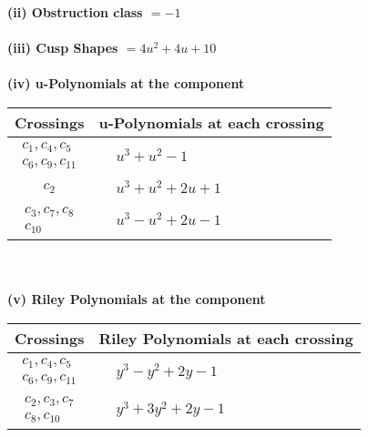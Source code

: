 \documentclass[1p]{elsarticle_modified}
\theoremstyle{definition}
\begin{document}
\flushleft \textbf{(ii) Obstruction class $= -1$}\\~\\
\flushleft \textbf{(iii) Cusp Shapes $= 4 u^2+4 u+10$}\\~\\
\newpage\renewcommand{\arraystretch}{1}
\flushleft \textbf{(iv) u-Polynomials at the component}\newline \\
\begin{tabular}{m{50pt}|m{274pt}}
Crossings & \hspace{64pt}u-Polynomials at each crossing \\
\hline $$\begin{aligned}c_{1},c_{4},c_{5}\\c_{6},c_{9},c_{11}\end{aligned}$$&$\begin{aligned}
&u^3+u^2-1
\end{aligned}$\\
\hline $$\begin{aligned}c_{2}\end{aligned}$$&$\begin{aligned}
&u^3+u^2+2 u+1
\end{aligned}$\\
\hline $$\begin{aligned}c_{3},c_{7},c_{8}\\c_{10}\end{aligned}$$&$\begin{aligned}
&u^3- u^2+2 u-1
\end{aligned}$\\
\hline
\end{tabular}\\~\\
\newpage\renewcommand{\arraystretch}{1}
\flushleft \textbf{(v) Riley Polynomials at the component}\newline \\
\begin{tabular}{m{50pt}|m{274pt}}
Crossings & \hspace{64pt}Riley Polynomials at each crossing \\
\hline $$\begin{aligned}c_{1},c_{4},c_{5}\\c_{6},c_{9},c_{11}\end{aligned}$$&$\begin{aligned}
&y^3- y^2+2 y-1
\end{aligned}$\\
\hline $$\begin{aligned}c_{2},c_{3},c_{7}\\c_{8},c_{10}\end{aligned}$$&$\begin{aligned}
&y^3+3 y^2+2 y-1
\end{aligned}$\\
\hline
\end{tabular}\\~\\
\end{document}
